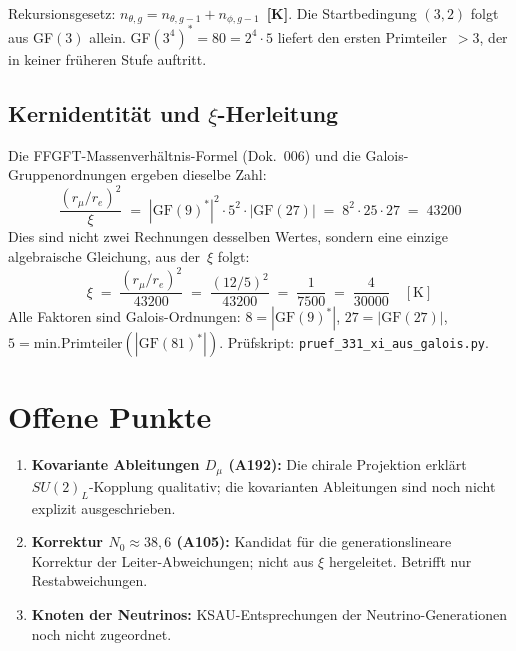 Rekursionsgesetz: $n_{\theta,g} = n_{\theta,g-1} + n_{\phi,g-1}$~\textbf{[K]}.
Die Startbedingung $(3,2)$ folgt aus GF$(3)$ allein.
GF$(3^4)^* = 80 = 2^4 \cdot 5$ liefert den ersten Primteiler~$>3$,
der in keiner früheren Stufe auftritt.

\subsection*{Kernidentität und $\xi$-Herleitung}

Die FFGFT-Massenverhältnis-Formel (Dok.~006) und die
Galois-Gruppenordnungen ergeben dieselbe Zahl:
\begin{equation}
  \frac{(r_\mu/r_e)^2}{\xi}
  \;=\;
  |\text{GF}(9)^*|^2 \cdot 5^2 \cdot |\text{GF}(27)|
  \;=\; 8^2 \cdot 25 \cdot 27
  \;=\; 43200
  \label{eq:xi_galois}
\end{equation}
Dies sind nicht zwei Rechnungen desselben Wertes,
sondern eine einzige algebraische Gleichung, aus der~$\xi$ folgt:
\begin{equation}
  \xi \;=\; \frac{(r_\mu/r_e)^2}{43200}
  \;=\; \frac{(12/5)^2}{43200}
  \;=\; \frac{1}{7500}
  \;=\; \frac{4}{30000}
  \quad [\text{K}]
\end{equation}
Alle Faktoren sind Galois-Ordnungen:
$8=|\text{GF}(9)^*|$, $27=|\text{GF}(27)|$,
$5=\text{min.Primteiler}(|\text{GF}(81)^*|)$.
Prüfskript: \texttt{pruef\_331\_xi\_aus\_galois.py}.

\section{Offene Punkte}

\begin{enumerate}
  \item \textbf{Kovariante Ableitungen $D_\mu$ (A192):} Die chirale
    Projektion erklärt $SU(2)_L$-Kopplung qualitativ; die kovarianten
    Ableitungen sind noch nicht explizit ausgeschrieben.
  \item \textbf{Korrektur $N_0 \approx 38{,}6$ (A105):} Kandidat für
    die generationslineare Korrektur der Leiter-Abweichungen; nicht aus
    $\xi$ hergeleitet. Betrifft nur Restabweichungen.
  \item \textbf{Knoten der Neutrinos:} KSAU-Entsprechungen der
    Neutrino-Generationen noch nicht zugeordnet.
\end{enumerate}

